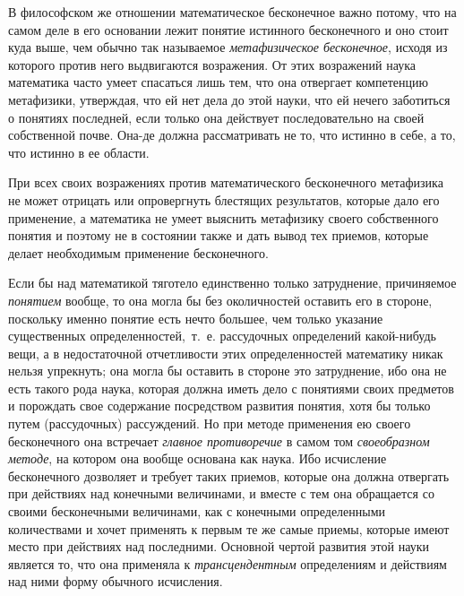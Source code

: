 {В философском же отношении математическое бесконечное важно потому, что на
самом деле в его основании лежит понятие истинного бесконечного и оно стоит
куда выше, чем обычно так называемое
{\em метафизическое бесконечное}, исходя из которого
против него выдвигаются возражения. От этих возражений наука математика
часто умеет спасаться лишь тем, что она отвергает компетенцию метафизики,
утверждая, что ей нет дела до этой науки, что ей нечего заботиться о
понятиях последней, если только она действует последовательно на своей
собственной почве. Она-де должна рассматривать не то, что истинно в себе, а
то, что истинно в ее области.

При всех своих возражениях против математического бесконечного метафизика не
может отрицать или опровергнуть блестящих результатов, которые дало его
применение, а математика не умеет выяснить метафизику своего собственного
понятия и поэтому не в состоянии также и дать вывод тех приемов, которые
делает необходимым применение бесконечного.

Если бы над математикой тяготело единственно только затруднение, причиняемое
{\em понятием} вообще, то она могла бы без околичностей
оставить его в стороне, поскольку именно понятие есть нечто большее, чем
только указание существенных определенностей,~т.~е. рассудочных определений
какой-нибудь вещи, а в недостаточной отчетливости этих определенностей
математику никак нельзя упрекнуть; она могла бы оставить в стороне это
затруднение, ибо она не есть такого рода наука, которая должна иметь дело с
понятиями своих предметов и порождать свое содержание посредством развития
понятия, хотя бы только путем (рассудочных) рассуждений. Но при методе
применения ею своего бесконечного она встречает
{\em главное противоречие} в самом том
{\em своеобразном методе}, на котором она вообще
основана как наука. Ибо исчисление бесконечного дозволяет и требует таких
приемов, которые она должна отвергать при действиях над конечными
величинами, и вместе с тем она обращается со своими бесконечными
величинами, как с конечными определенными количествами и хочет применять к
первым те же самые приемы, которые имеют место при действиях над
последними. Основной чертой развития этой науки является то, что она
применяла к {\em трансцендентным} определениям и
действиям над ними форму обычного исчисления.

}
